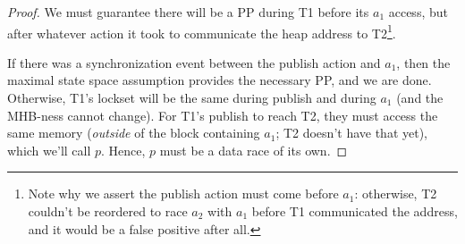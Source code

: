 \begin{proof}
We must guarantee there will be a PP during T1 before its $a_1$ access, but after whatever action it took to communicate the heap address to T2\footnote{
Note why we assert the publish action must come before $a_1$: otherwise, T2 couldn't be reordered to race $a_2$ with $a_1$ before T1 communicated the address, and it would be a false positive after all.}.


If there was a synchronization event between the publish action and $a_1$,
then the maximal state space assumption provides the necessary PP, and we are done.
Otherwise, T1's lockset will be the same during publish and during $a_1$ (and the MHB-ness cannot change).
For T1's publish to reach T2, they must access the same memory ({\em outside} of the block containing $a_1$; T2 doesn't have that yet),
which we'll call $p$.
Hence, $p$ must be a data race of its own.


\end{proof}
